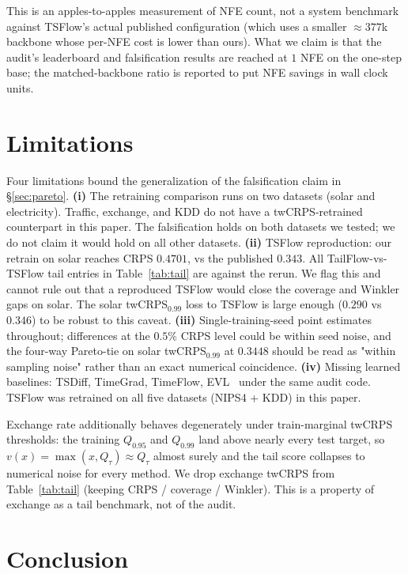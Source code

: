\documentclass{article}
\begin{document}
This is an apples-to-apples measurement of NFE count, not a system
benchmark against TSFlow's actual published configuration (which
uses a smaller $\approx 377$k backbone whose per-NFE cost is lower
than ours). What we claim is that the audit's leaderboard and
falsification results are reached at $1$ NFE on the one-step base;
the matched-backbone ratio is reported to put NFE savings in wall
clock units.

\section{Limitations}
\label{sec:limitations}

Four limitations bound the generalization of the falsification
claim in \S\ref{sec:pareto}. \textbf{(i)} The retraining comparison
runs on two datasets (solar and electricity). Traffic, exchange,
and KDD do not have a twCRPS-retrained counterpart in this paper.
The falsification holds on both datasets we tested; we do not claim
it would hold on all other datasets. \textbf{(ii)} TSFlow reproduction: our retrain on
solar reaches CRPS $0.4701$, vs the published $0.343$. All
TailFlow-vs-TSFlow tail entries in Table~\ref{tab:tail} are against
the rerun. We flag this and cannot rule out that a reproduced TSFlow
would close the coverage and Winkler gaps on solar. The solar
twCRPS$_{0.99}$ loss to TSFlow is large enough ($0.290$ vs $0.346$)
to be robust to this caveat. \textbf{(iii)} Single-training-seed
point estimates throughout; differences at the $0.5\%$ CRPS level
could be within seed noise, and the four-way Pareto-tie on solar
twCRPS$_{0.99}$ at $0.3448$ should be read as "within sampling
noise" rather than an exact numerical coincidence.
\textbf{(iv)} Missing learned baselines: TSDiff, TimeGrad, TimeFlow,
EVL~\cite{ding2019evl} under the same audit code. TSFlow was
retrained on all five datasets (NIPS4 + KDD) in this paper.

Exchange rate additionally behaves degenerately under train-marginal
twCRPS thresholds: the training $Q_{0.95}$ and $Q_{0.99}$ land above
nearly every test target, so $v(x) = \max(x, Q_\tau) \approx Q_\tau$
almost surely and the tail score collapses to numerical noise for
every method. We drop exchange twCRPS from Table~\ref{tab:tail}
(keeping CRPS / coverage / Winkler). This is a property of exchange
as a tail benchmark, not of the audit.

\section{Conclusion}
\label{sec:conclusion}
\end{document}
